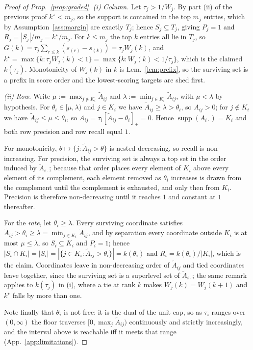 \documentclass{article}
\newcommand{\supp}{\operatorname{supp}}
\begin{document}
\begin{proof}[Proof of Prop.~\ref{prop:graded}]
\emph{(i) Column.} Let $\tau_j > 1/W_j$. By part (ii) of the previous proof $k^\star < m_j$, so the support is
contained in the top $m_j$ entries, which by Assumption~\ref{ass:margin} are exactly $T_j$;
hence $S_j \subseteq T_j$, giving $P_j = 1$ and $R_j = |S_j|/m_j = k^\star/m_j$. For
$k \leq m_j$ the top $k$ entries all lie in $T_j$, so
$G(k) = \tau_j \sum_{r\leq k}(s_{(r)} - s_{(k)}) = \tau_j W_j(k)$, and
$k^\star = \max\{k : \tau_j W_j(k) < 1\} = \max\{k : W_j(k) < 1/\tau_j\}$, which is the
claimed $k(\tau_j)$. Monotonicity of $W_j(k)$ in $k$ is Lem.~\ref{lem:prefix}, so the
surviving set is a prefix in score order and the lowest-scoring targets are shed first.

\emph{(ii) Row.} Write $\mu := \max_{j \notin K_i}\tilde A_{ij}$ and $\lambda := \min_{j \in K_i}\tilde A_{ij}$,
with $\mu < \lambda$ by hypothesis. For $\theta_i \in [\mu, \lambda)$ and $j \in K_i$ we have
$\tilde A_{ij} \geq \lambda > \theta_i$, so $A_{ij} > 0$; for $j \notin K_i$ we have
$\tilde A_{ij} \leq \mu \leq \theta_i$, so $A_{ij} = \tau_i[\tilde A_{ij}-\theta_i]_+ = 0$. Hence
$\supp(A_{i\cdot}) = K_i$ and both row precision and row recall equal $1$.

For monotonicity, $\theta \mapsto \{j : \tilde A_{ij} > \theta\}$ is nested decreasing, so
recall is non-increasing. For precision, the surviving set is always a top set in the order
induced by $\tilde A_{i\cdot}$; because that order places every element of $K_i$ above every
element of its complement, each element removed as $\theta_i$ increases is drawn from the
complement until the complement is exhausted, and only then from $K_i$. Precision is therefore
non-decreasing until it reaches $1$ and constant at $1$ thereafter.

For the \emph{rate}, let $\theta_i \geq \lambda$. Every surviving coordinate satisfies
$\tilde A_{ij}>\theta_i\ge\lambda=\min_{j\in K_i}\tilde A_{ij}$, and by separation every
coordinate outside $K_i$ is at most $\mu\le\lambda$, so $S_i\subseteq K_i$ and $P_i=1$; hence
$|S_i\cap K_i|=|S_i|=|\{j\in K_i:\tilde A_{ij}>\theta_i\}|=k(\theta_i)$ and
$R_i=k(\theta_i)/|K_i|$, which is the claim. Coordinates leave in non-decreasing order of
$\tilde A_{ij}$ and tied coordinates leave together, since the surviving set is a superlevel set
of $\tilde A_{i\cdot}$; the same remark applies to $k(\tau_j)$ in (i), where a tie at rank $k$
makes $W_j(k)=W_j(k{+}1)$ and $k^\star$ falls by more than one.

Note finally that $\theta_i$ is not free: it is the dual of the unit cap, so as $\tau_i$ ranges
over $(0,\infty)$ the floor traverses $[0,\max_j\tilde A_{ij})$ continuously and strictly
increasingly, and the interval above is reachable iff it meets that range
(App.~\ref{app:limitations}).
\end{proof}
\end{document}
